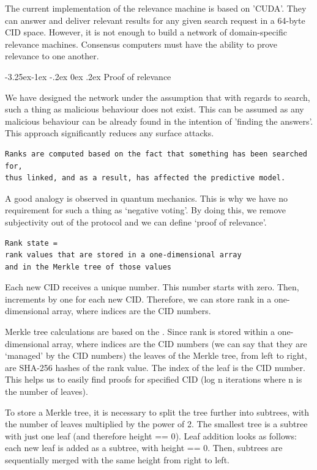 \documentclass[8pt,oneside]{amsart}
\makeatletter
\newcommand{\linkgreen}[2]{\href{#1}{\color{green}{#2}}}
\renewcommand\subsection{\@startsection{subsection}{2}{\z@}%
                                     {-3.25ex\@plus -1ex \@minus -.2ex}%
                                     {0ex \@plus .2ex}%
                                     {\play\Large}}%
\newcommand{\titleSection}[1]{\subsection{#1}}
\newcommand{\code}[1]{{\PlayBold #1}}
\makeatother
\begin{document}
\begin{Abstract}
The current implementation of the relevance machine is based on 'CUDA'. They can answer and deliver relevant results for any given search request in a 64-byte CID space. However, it is not enough to build a network of domain-specific relevance machines. Consensus computers must have the ability to prove relevance to one another.

\titleSection{Proof of relevance}\label{Proof of relevance}

We have designed the network under the assumption that with regards to search, such a thing as malicious behaviour does not exist. This can be assumed as any malicious behaviour can be already found in the intention of 'finding the answers'. This approach significantly reduces any surface attacks.

\begin{lstlisting}
Ranks are computed based on the fact that something has been searched for,
thus linked, and as a result, has affected the predictive model.
\end{lstlisting}

A good analogy is observed in quantum mechanics. This is why we have no requirement for such a thing as ‘negative voting’. By doing this, we remove subjectivity out of the protocol and we can define ‘proof of relevance’.

\begin{lstlisting}
Rank state =
rank values that are stored in a one-dimensional array
and in the Merkle tree of those values
\end{lstlisting}

Each new CID receives a unique number. This number starts with zero. Then, increments by one for each new CID. Therefore, we can store rank in a one-dimensional array, where indices are the CID numbers.

Merkle tree calculations are based on the \linkgreen{https://tools.ietf.org/html/rfc6962#section-2.1}{RFC-6962 standard}. Since rank is stored within a one-dimensional array, where indices are the CID numbers (we can say that they are ‘managed’ by the CID numbers) the leaves of the Merkle tree, from left to right, are \code{SHA-256} hashes of the rank value. The index of the leaf is the CID number. This helps us to easily find proofs for specified CID (\code{log n} iterations where \code{n} is the number of leaves).

To store a Merkle tree, it is necessary to split the tree further into subtrees, with the number of leaves multiplied by the power of 2. The smallest tree is a subtree with just one leaf (and therefore \code{height == 0}). Leaf addition looks as follows: each new leaf is added as a subtree, with \code{height == 0}. Then, subtrees are sequentially merged with the same \code{height} from right to left.


\end{Abstract}
\end{document}
